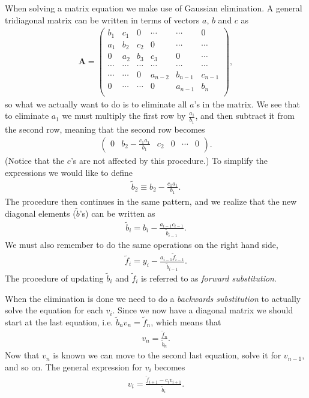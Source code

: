 \documentclass[12pt, a4paper]{article}
\begin{document}
When solving a matrix equation we make use of Gaussian elimination. A general tridiagonal matrix can be 
written in terms of vectors $a$, $b$ and $c$ as  
\begin{align*}
\mathbf{A} = \left(\begin{array}{cccccc}
b_1 & c_1 & 0 & \cdots & \cdots & 0 \\ 
a_1 & b_2 & c_2 & 0 & \cdots & \cdots \\ 
0 & a_2 & b_3 & c_3 & 0 & \cdots \\
\cdots & \cdots & \cdots & \cdots & \cdots & \cdots \\              
\cdots & \cdots  & 0 & a_{n-2} & b_{n-1} & c_{n-1} \\ 
0 & \cdots & \cdots & 0 & a_{n-1} & b_n \\  
\end{array} \right), 
\end{align*}
so what we actually want to do is to eliminate all $a$'s in the matrix. We see that to eliminate $a_1$ 
we must multiply the first row by $\frac{a_1}{b_1}$, and then subtract it from the second row, meaning that 
the second row becomes 
\begin{align*}
\left( \begin{array}{cccccc}
0 & b_2 - \frac{c_1 a_1}{b_1} & c_2 & 0 & \cdots & 0 
\end{array} \right). 
\end{align*}
(Notice that the $c$'s are not affected by this procedure.)  
To simplify the expressions we would like to define 
\begin{align*}
\tilde{b}_2 \equiv b_2 - \frac{c_1 a_1}{b_1}.  
\end{align*}
The procedure then continues in the same pattern, and we realize that the new diagonal elements 
($\tilde{b}$'s) can be written as   
\begin{align}
\tilde{b}_i = b_i - \frac{a_{i-1} c_{i-1}}{\tilde{b}_{i-1}}. 
\label{btilde}
\end{align}
We must also remember to do the same operations on the right hand side, 
\begin{align}
\tilde{f}_i = y_i - \frac{a_{i-1} \tilde{f}_{i-1}}{\tilde{b}_{i-1}}. 
\label{ftilde}
\end{align}
The procedure of updating $\tilde{b}_i$ and $\tilde{f}_i$ is referred to as \textit{forward substitution}. 

When the elimination is done we need to do a \textit{backwards substitution} to actually solve the 
equation for each $v_i$. Since we now have a diagonal matrix we should start at the last equation, i.e. 
$\tilde{b}_n v_n = \tilde{f}_n$, which means that 
\begin{align*}
v_n = \frac{\tilde{f}_n}{\tilde{b}_n}. 
\end{align*} 
Now that $v_n$ is known we can move to the second last equation, solve it for $v_{n-1}$, and so on. The 
general expression for $v_i$ becomes 
\begin{align*}
v_i = \frac{\tilde{f}_{i+1} - c_i v_{i+1}}{\tilde{b}_i}.
\label{vi} 
\end{align*}
\end{document}
